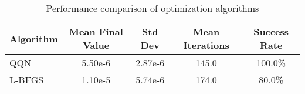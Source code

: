 \begin{table}[htbp]
\centering
\caption{Performance comparison of optimization algorithms}
\label{tab:performance}
\begin{tabular}{lcccc}
\toprule
Algorithm & Mean Final Value & Std Dev & Mean Iterations & Success Rate \\
\midrule
QQN & 5.50e-6 & 2.87e-6 & 145.0 & 100.0\% \\
L-BFGS & 1.10e-5 & 5.74e-6 & 174.0 & 80.0\% \\
\bottomrule
\end{tabular}
\end{table}
